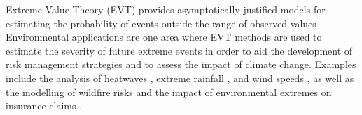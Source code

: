 \documentclass[
  12pt]{article}
\begin{document}
Extreme Value Theory (EVT) provides asymptotically justified models for estimating the probability of events outside the range of observed values \citep{Coles2001}.
Environmental applications are one area where EVT methods are used to estimate the severity of future extreme events in order to aid the development of risk management strategies and to assess the impact of climate change. 
Examples include the analysis of heatwaves \citep{tanarhte2015heat, french2019quantifying}, extreme rainfall \citep{osei2021estimation}, and wind speeds \citep{steinkohl2013extreme, soukissian2015effect}, as well as the modelling of wildfire risks \citep{Koh2024} and the impact of environmental extremes on insurance claims \citep{Rohrbeck_flooding, Miralles2024}. 
\end{document}
